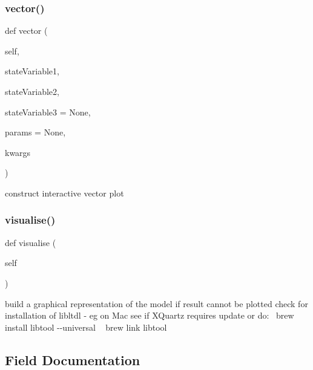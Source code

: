 \subsubsection{\texorpdfstring{vector()}{vector()}}
{\footnotesize\ttfamily def vector (\begin{DoxyParamCaption}\item[{}]{self,  }\item[{}]{state\+Variable1,  }\item[{}]{state\+Variable2,  }\item[{}]{state\+Variable3 = {\ttfamily None},  }\item[{}]{params = {\ttfamily None},  }\item[{}]{kwargs }\end{DoxyParamCaption})}



construct interactive vector plot 

\mbox{\label{class_mu_mo_t_1_1_mu_mo_t_1_1_mu_mo_tmodel_affc6fae7ea26f85cde5366af8af85200}} 
\subsubsection{\texorpdfstring{visualise()}{visualise()}}
{\footnotesize\ttfamily def visualise (\begin{DoxyParamCaption}\item[{}]{self }\end{DoxyParamCaption})}



build a graphical representation of the model if result cannot be plotted check for installation of libltdl -\/ eg on Mac see if X\+Quartz requires update or do\+:~\newline
 {\ttfamily brew install libtool -\/-\/universal} ~\newline
 {\ttfamily brew link libtool} 



\subsection{Field Documentation}
\mbox{\label{class_mu_mo_t_1_1_mu_mo_t_1_1_mu_mo_tmodel_a04c0353d4e8a6c3f2e0a1fb36ed9a832}} 

